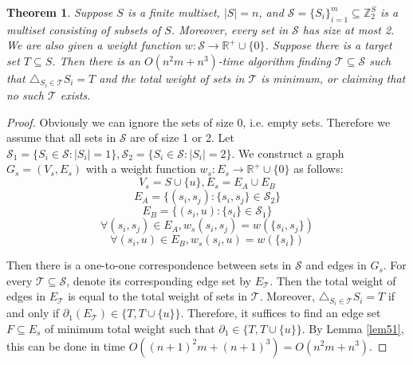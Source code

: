 \documentclass[10pt,fleqn]{article}
\newtheorem{theorem}{Theorem}[section]
\newcommand{\R}{\mathbb{R}}
\newcommand{\Z}{\mathbb{Z}}
\newcommand{\mc}[1]{\mathcal{#1}}
\begin{document}
	\begin{theorem}\label{thm51}
		Suppose $S$ is a finite multiset, $|S|=n$, and $\mathcal{S}=\{S_i\}_{i=1}^{m}\subseteq\Z_2^S$ is a multiset consisting of subsets of $S$. Moreover, every set in $\mc{S}$ has size at most 2. We are also given a weight function $w:\mc{S}\to\R^+\cup\{0\}$. Suppose there is a target set $T\subseteq S$. Then there is an $O(n^2m+n^3)$-time algorithm finding $\mathcal{T}\subseteq\mc{S}$ such that $\triangle_{S_i\in\mc{T}}S_i=T$ and the total weight of sets in $\mc{T}$ is minimum, or claiming that no such $\mc{T}$ exists.
	\end{theorem}
	\begin{proof}
		Obviously we can ignore the sets of size 0, i.e. empty sets. Therefore we assume that all sets in $\mc{S}$ are of size 1 or 2. Let $\mc{S}_1=\{S_i\in\mc{S}:|S_i|=1\},\mc{S}_2=\{S_i\in\mc{S}:|S_i|=2\}$. We construct a graph $G_s=(V_s,E_s)$ with a weight function $w_s:E_s\to\R^+\cup\{0\}$ as follows:
		$$V_s=S\cup\{u\},E_s=E_A\cup E_B$$
		$$E_A=\{(s_i,s_j):\{s_i,s_j\}\in\mc{S}_2\}$$
		$$E_B=\{(s_i,u):\{s_i\}\in\mc{S}_1\}$$
		$$\forall(s_i,s_j)\in E_A,w_s(s_i,s_j)=w(\{s_i,s_j\})$$
		$$\forall(s_i,u)\in E_B,w_s(s_i,u)=w(\{s_i\})$$ \par
		Then there is a one-to-one correspondence between sets in $\mc{S}$ and edges in $G_s$. For every $\mathcal{T}\subseteq\mc{S}$, denote its corresponding edge set by $E_{\mc{T}}$. Then the total weight of edges in $E_{\mc{T}}$ is equal to the total weight of sets in $\mc{T}$. Moreover, $\triangle_{S_i\in \mc{T}}S_i=T$ if and only if $\partial_1(E_{\mc{T}})\in\{T,T\cup\{u\}\}$. Therefore, it suffices to find an edge set $F\subseteq E_s$ of minimum total weight such that $\partial_1\in\{T,T\cup\{u\}\}$. By Lemma \ref{lem51}, this can be done in time $O((n+1)^2m+(n+1)^3)=O(n^2m+n^3)$.
	\end{proof}
\end{document}
